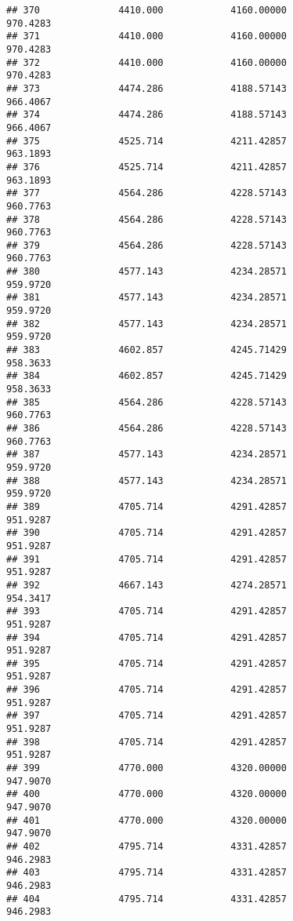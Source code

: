 \documentclass[]{article}
\begin{document}
\begin{verbatim}
## 370              4410.000            4160.00000                 970.4283
## 371              4410.000            4160.00000                 970.4283
## 372              4410.000            4160.00000                 970.4283
## 373              4474.286            4188.57143                 966.4067
## 374              4474.286            4188.57143                 966.4067
## 375              4525.714            4211.42857                 963.1893
## 376              4525.714            4211.42857                 963.1893
## 377              4564.286            4228.57143                 960.7763
## 378              4564.286            4228.57143                 960.7763
## 379              4564.286            4228.57143                 960.7763
## 380              4577.143            4234.28571                 959.9720
## 381              4577.143            4234.28571                 959.9720
## 382              4577.143            4234.28571                 959.9720
## 383              4602.857            4245.71429                 958.3633
## 384              4602.857            4245.71429                 958.3633
## 385              4564.286            4228.57143                 960.7763
## 386              4564.286            4228.57143                 960.7763
## 387              4577.143            4234.28571                 959.9720
## 388              4577.143            4234.28571                 959.9720
## 389              4705.714            4291.42857                 951.9287
## 390              4705.714            4291.42857                 951.9287
## 391              4705.714            4291.42857                 951.9287
## 392              4667.143            4274.28571                 954.3417
## 393              4705.714            4291.42857                 951.9287
## 394              4705.714            4291.42857                 951.9287
## 395              4705.714            4291.42857                 951.9287
## 396              4705.714            4291.42857                 951.9287
## 397              4705.714            4291.42857                 951.9287
## 398              4705.714            4291.42857                 951.9287
## 399              4770.000            4320.00000                 947.9070
## 400              4770.000            4320.00000                 947.9070
## 401              4770.000            4320.00000                 947.9070
## 402              4795.714            4331.42857                 946.2983
## 403              4795.714            4331.42857                 946.2983
## 404              4795.714            4331.42857                 946.2983

\end{verbatim}
\end{document}
